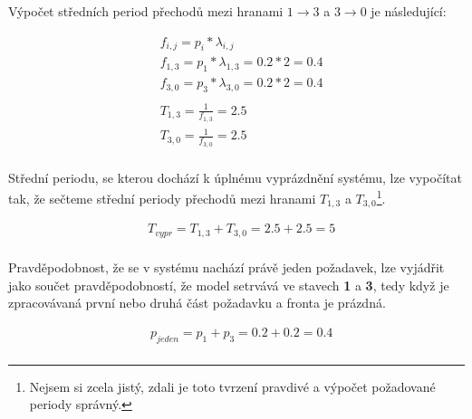 \documentclass[12pt, a4paper]{article}
\begin{document}
Výpočet středních period přechodů mezi hranami $1 \rightarrow 3$ a $3 \rightarrow 0$ je následující:

\begin{equation}
    \begin{split}
    & f_{i, j} = p_{i} * \lambda_{i, j} \\
    & f_{1, 3} = p_{1} * \lambda_{1, 3} = 0.2 * 2 = 0.4 \\
    & f_{3, 0} = p_{3} * \lambda_{3, 0} = 0.2 * 2 = 0.4 \\
    & \\
    & T_{1, 3} = \frac{1}{f_{1, 3}} = 2.5 \\
    & T_{3, 0} = \frac{1}{f_{3, 0}} = 2.5 \\
    \end{split}
\end{equation}

Střední periodu, se kterou dochází k úplnému vyprázdnění systému, lze vypočítat tak, že sečteme střední periody přechodů mezi hranami $T_{1, 3}$ a $T_{3, 0}$\footnote{Nejsem si zcela jistý, zdali je toto tvrzení pravdivé a výpočet požadované periody správný.}.

\begin{equation}
    \begin{split}
    & T_{vypr} = T_{1, 3} + T_{3, 0} = 2.5 + 2.5 = 5 \\ 
    \end{split}
\end{equation}

Pravděpodobnost, že se v systému nachází právě jeden požadavek, lze vyjádřit jako součet pravděpodobností, že model setrvává ve stavech \textbf{1} a \textbf{3}, tedy když je zpracovávaná první nebo druhá část požadavku a fronta je prázdná.

\begin{equation}
    \begin{split}
    & p_{jeden} = p_{1} + p_{3} = 0.2 + 0.2 = 0.4 \\ 
    \end{split}
\end{equation}
\end{document}
